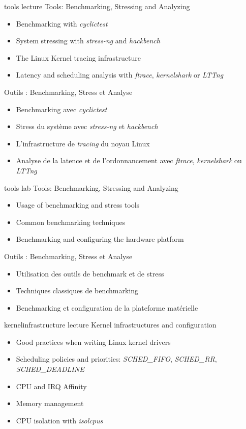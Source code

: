 {tools}
{lecture}
{Tools: Benchmarking, Stressing and Analyzing}
{
  \begin{itemize}
  \item Benchmarking with {\em cyclictest}
  \item System stressing with {\em stress-ng} and {\em hackbench}
  \item The Linux Kernel tracing infrastructure
  \item Latency and scheduling analysis with {\em ftrace}, {\em
      kernelshark} or {\em LTTng}
  \end{itemize}
}
{Outils : Benchmarking, Stress et Analyse}
{
  \begin{itemize}
  \item Benchmarking avec {\em cyclictest}
  \item Stress du système avec {\em stress-ng} et {\em hackbench}
  \item L'infrastructure de {\em tracing} du noyau Linux
  \item Analyse de la latence et de l'ordonnancement avec {\em
      ftrace}, {\em kernelshark} ou {\em LTTng}
  \end{itemize}
}
{tools}
{lab}
{Tools: Benchmarking, Stressing and Analyzing}
{
  \begin{itemize}
  \item Usage of benchmarking and stress tools
  \item Common benchmarking techniques
  \item Benchmarking and configuring the hardware platform
  \end{itemize}
}
{Outils : Benchmarking, Stress et Analyse}
{
  \begin{itemize}
  \item Utilisation des outils de benchmark et de stress
  \item Techniques classiques de benchmarking
  \item Benchmarking et configuration de la plateforme matérielle
  \end{itemize}
}
{kernelinfrastructure}
{lecture}
{Kernel infrastructures and configuration}
{
  \begin{itemize}
  \item Good practices when writing Linux kernel drivers
  \item Scheduling policies and priorities: {\em SCHED\_FIFO}, {\em
      SCHED\_RR}, {\em SCHED\_DEADLINE}
  \item CPU and IRQ Affinity
  \item Memory management
  \item CPU isolation with {\em isolcpus}
  \end{itemize}
}
